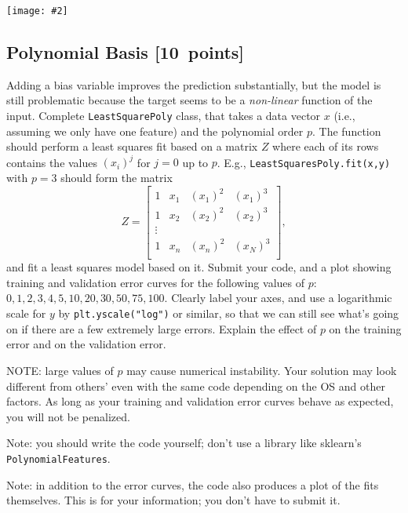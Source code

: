 \documentclass{article}
\newcommand{\blu}[1]{{\textcolor{blu}{#1}}}
\let\ask\blu
\newcommand\pts[1]{\textcolor{pointscolour}{[#1~points]}}
\newcommand{\centerfig}[2]{\begin{center}\texttt{[image: \#2]}\end{center}}
\begin{document}
\centerfig{0.7}{figs/least_squares_yes_bias}


\subsection{Polynomial Basis \pts{10}}

Adding a bias variable improves the prediction substantially, but the model is still problematic because the target seems to be a \emph{non-linear} function of the input.
Complete \texttt{LeastSquarePoly} class, that takes a data vector $x$ (i.e., assuming we only have one feature) and the polynomial order $p$. The function should perform a least squares fit based on a matrix $Z$ where each of its rows contains the values $(x_{i})^j$ for $j=0$ up to $p$. E.g., \texttt{LeastSquaresPoly.fit(x,y)}  with $p = 3$ should form the matrix
\[
Z =
\left[\begin{array}{cccc}
1 & x_1 & (x_1)^2 & (x_1)^3\\
1 & x_2 & (x_2)^2 & (x_2)^3\\
\vdots\\
1 & x_n & (x_n)^2 & (x_N)^3\\
\end{array}
\right],
\]
and fit a least squares model based on it.
\ask{Submit your code, and a plot showing training and validation error curves for the following values of $p$: $0,1,2,3,4,5,10,20,30,50,75,100$. Clearly label your axes, and use a logarithmic scale for $y$} by \texttt{plt.yscale("log")} or similar, so that we can still see what's going on if there are a few extremely large errors. \ask{Explain the effect of $p$ on the training error and on the validation error.}

NOTE: large values of $p$ may cause numerical instability. Your solution may look different from others' even with the same code depending on the OS and other factors. As long as your training and validation error curves behave as expected, you will not be penalized.

Note: you should write the code yourself; don't use a library like sklearn's \texttt{PolynomialFeatures}.

Note: in addition to the error curves, the code also produces a plot of the fits themselves. This is for your information; you don't have to submit it.
\end{document}
